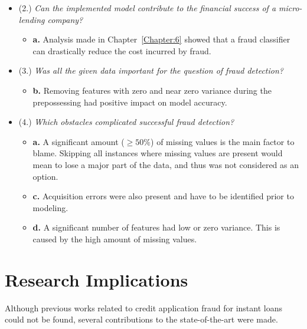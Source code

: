 \begin{itemize}
\begin{itemize}
    \end{itemize}
    
    \item (2.) \textit{Can the implemented model contribute to the financial success of a micro-lending company?}
    \begin{itemize}     
        \item \textbf{a.} Analysis made in Chapter~\ref{Chapter:6} showed that a fraud classifier can drastically reduce the cost incurred by fraud.
    \end{itemize}

    
    \item (3.) \textit{Was all the given data important for the question of fraud detection?}
        \begin{itemize}        
            \item \textbf{b.} Removing features with zero and near zero variance during the prepossessing had positive impact on model accuracy.
        \end{itemize}


    \item (4.) \textit{Which obstacles complicated successful fraud detection?}
        \begin{itemize}        
            \item \textbf{a.} A significant amount (\(\geq 50\%\)) of missing values is the main factor to blame. Skipping all instances where missing values are present would mean to lose a major part of the data, and thus was not considered as an option.
        \end{itemize}
        
        \begin{itemize}        
            \item \textbf{c.} Acquisition errors were also present and have to be identified prior to modeling.
        \end{itemize}
        
        \begin{itemize}        
            \item \textbf{d.} A significant number of features had low or zero variance. This is caused by the high amount of missing values.
        \end{itemize}
    
\end{itemize}

\section{Research Implications} \label{ch:ti}
Although previous works related to credit application fraud for instant loans could not be found, several contributions to the state-of-the-art were made.

